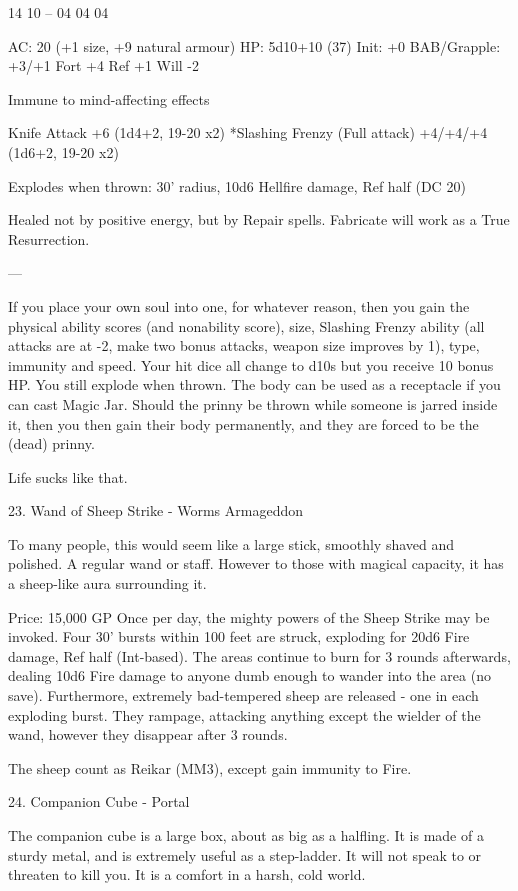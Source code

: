 \begin{multicols}{2}
14 10 -- 04 04 04

AC: 20 (+1 size, +9 natural armour)
HP: 5d10+10 (37)
Init: +0
BAB/Grapple: +3/+1
Fort +4
Ref +1
Will -2

Immune to mind-affecting effects

Knife Attack +6 (1d4+2, 19-20 x2)
*Slashing Frenzy (Full attack) +4/+4/+4 (1d6+2, 19-20 x2)

Explodes when thrown: 30' radius, 10d6 Hellfire damage, Ref half (DC 20)

Healed not by positive energy, but by Repair spells. Fabricate will work as a True Resurrection.

---

If you place your own soul into one, for whatever reason, then you gain the physical ability scores (and nonability score), size, Slashing Frenzy ability (all attacks are at -2, make two bonus attacks, weapon size improves by 1), type, immunity and speed. Your hit dice all change to d10s but you receive 10 bonus HP. You still explode when thrown. The body can be used as a receptacle if you can cast Magic Jar. Should the prinny be thrown while someone is jarred inside it, then you then gain their body permanently, and they are forced to be the (dead) prinny.

Life sucks like that.


23. Wand of Sheep Strike - Worms Armageddon

To many people, this would seem like a large stick, smoothly shaved and polished. A regular wand or staff. However to those with magical capacity, it has a sheep-like aura surrounding it.

Price: 15,000 GP
Once per day, the mighty powers of the Sheep Strike may be invoked. Four 30' bursts within 100 feet are struck, exploding for 20d6 Fire damage, Ref half (Int-based). The areas continue to burn for 3 rounds afterwards, dealing 10d6 Fire damage to anyone dumb enough to wander into the area (no save). Furthermore, extremely bad-tempered sheep are released - one in each exploding burst. They rampage, attacking anything except the wielder of the wand, however they disappear after 3 rounds.

The sheep count as Reikar (MM3), except gain immunity to Fire.


24. Companion Cube - Portal

The companion cube is a large box, about as big as a halfling. It is made of a sturdy metal, and is extremely useful as a step-ladder. It will not speak to or threaten to kill you. It is a comfort in a harsh, cold world.


\end{multicols}
